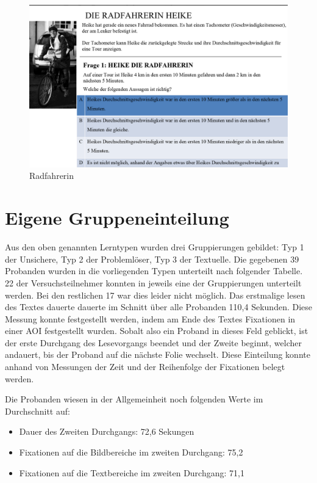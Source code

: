 \begin{figure}[H]
\noindent\hspace{0.5mm}\includegraphics[width=17cm]{./Ressourcen/Radfahrerin.png}
\caption{Radfahrerin}
\end{figure}


\section{Eigene Gruppeneinteilung}

Aus den oben genannten Lerntypen wurden drei Gruppierungen gebildet: Typ 1 der Unsichere, Typ 2 der Problemlöser, Typ 3 der Textuelle. Die gegebenen 39 Probanden wurden in die vorliegenden Typen unterteilt nach folgender Tabelle. 22 der Versuchsteilnehmer konnten in jeweils eine der Gruppierungen unterteilt werden. Bei den restlichen 17 war dies leider nicht möglich. Das erstmalige lesen des Textes dauerte dauerte im Schnitt über alle Probanden 110,4 Sekunden. Diese Messung konnte festgestellt werden, indem am Ende des Textes Fixationen in einer AOI festgestellt wurden. Sobalt also ein Proband in dieses Feld geblickt, ist der erste Durchgang des Lesevorgangs beendet und der Zweite beginnt, welcher andauert, bis der Proband auf die nächste Folie wechselt. Diese Einteilung konnte anhand von Messungen der Zeit und der Reihenfolge der Fixationen belegt werden. 

Die Probanden wiesen in der Allgemeinheit noch folgenden Werte im Durchschnitt auf:
    \begin{itemize}
        \item Dauer des Zweiten Durchgangs: 72,6 Sekungen 
        \item Fixationen auf die Bildbereiche im zweiten Durchgang: 75,2
        \item Fixationen auf die Textbereiche im zweiten Durchgang: 71,1
    \end{itemize}

